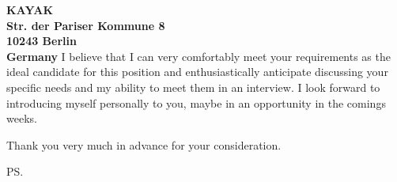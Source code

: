 \documentclass[a4paper]{joaosoares-letter}
\begin{document}
\begin{letter}{\bfseries KAYAK\\Str. der Pariser Kommune 8\\10243 Berlin\\Germany}
I believe that I can very comfortably meet your requirements as the ideal candidate for this position and enthusiastically anticipate discussing your specific needs and my ability to meet them in an interview. I look forward to introducing myself personally to you, maybe in an opportunity in the comings weeks.

\closing{ Thank you very much in advance for your consideration.}
\vspace{20pt}
\ps

\vspace{\fill}

\end{letter}
\end{document}
